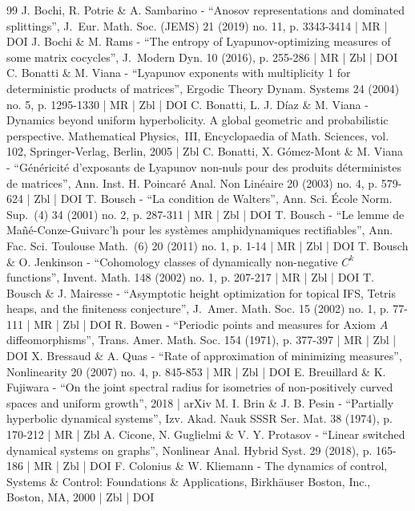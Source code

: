 \begin{thebibliography}{99}
J. Bochi, R. Potrie \& A. Sambarino - “Anosov representations and dominated splittings”, J. Eur. Math. Soc. (JEMS) 21 (2019) no. 11, p. 3343-3414 | MR | DOI
J. Bochi \& M. Rams - “The entropy of Lyapunov-optimizing measures of some matrix cocycles”, J. Modern Dyn. 10 (2016), p. 255-286 | MR | Zbl | DOI
C. Bonatti \& M. Viana - “Lyapunov exponents with multiplicity 1 for deterministic products of matrices”, Ergodic Theory Dynam. Systems 24 (2004) no. 5, p. 1295-1330 | MR | Zbl | DOI
C. Bonatti, L. J. Díaz \& M. Viana - Dynamics beyond uniform hyperbolicity. A global geometric and probabilistic perspective. Mathematical Physics, III, Encyclopaedia of Math. Sciences, vol. 102, Springer-Verlag, Berlin, 2005 | Zbl
C. Bonatti, X. Gómez-Mont \& M. Viana - “Généricité d’exposants de Lyapunov non-nuls pour des produits déterministes de matrices”, Ann. Inst. H. Poincaré Anal. Non Linéaire 20 (2003) no. 4, p. 579-624 | Zbl | DOI
T. Bousch - “La condition de Walters”, Ann. Sci. École Norm. Sup. (4) 34 (2001) no. 2, p. 287-311 | MR | Zbl | DOI
T. Bousch - “Le lemme de Mañé-Conze-Guivarc’h pour les systèmes amphidynamiques rectifiables”, Ann. Fac. Sci. Toulouse Math. (6) 20 (2011) no. 1, p. 1-14 | MR | Zbl | DOI
T. Bousch \& O. Jenkinson - “Cohomology classes of dynamically non-negative $C^k$ functions”, Invent. Math. 148 (2002) no. 1, p. 207-217 | MR | Zbl | DOI
T. Bousch \& J. Mairesse - “Asymptotic height optimization for topical IFS, Tetris heaps, and the finiteness conjecture”, J. Amer. Math. Soc. 15 (2002) no. 1, p. 77-111 | MR | Zbl | DOI
R. Bowen - “Periodic points and measures for Axiom $A$ diffeomorphisms”, Trans. Amer. Math. Soc. 154 (1971), p. 377-397 | MR | Zbl | DOI
X. Bressaud \& A. Quas - “Rate of approximation of minimizing measures”, Nonlinearity 20 (2007) no. 4, p. 845-853 | MR | Zbl | DOI
E. Breuillard \& K. Fujiwara - “On the joint spectral radius for isometries of non-positively curved spaces and uniform growth”, 2018 | arXiv
M. I. Brin \& J. B. Pesin - “Partially hyperbolic dynamical systems”, Izv. Akad. Nauk SSSR Ser. Mat. 38 (1974), p. 170-212 | MR | Zbl
A. Cicone, N. Guglielmi \& V. Y. Protasov - “Linear switched dynamical systems on graphs”, Nonlinear Anal. Hybrid Syst. 29 (2018), p. 165-186 | MR | Zbl | DOI
F. Colonius \& W. Kliemann - The dynamics of control, Systems \& Control: Foundations \& Applications, Birkhäuser Boston, Inc., Boston, MA, 2000 | Zbl | DOI

\end{thebibliography}
